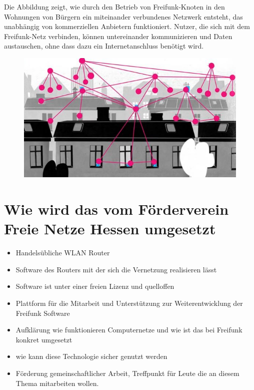 \documentclass[ngerman]{article}
\begin{document}
Die Abbildung zeigt, wie durch den Betrieb von Freifunk-Knoten in den Wohnungen von Bürgern ein miteinander verbundenes Netzwerk entsteht, das unabhängig von kommerziellen Anbietern funktioniert.
Nutzer, die sich mit dem Freifunk-Netz verbinden, können untereinander kommunizieren und Daten austauschen, ohne dass dazu ein Internetanschluss benötigt wird.

\begin{figure}[h!]
	\centering
	\includegraphics[width=.7\textwidth]{freifunk-mesh}
	\label{fig:freifunkwolke}
\end{figure}

\section*{Wie wird das vom Förderverein Freie Netze Hessen umgesetzt}
  \begin{itemize}
    \item Handelsübliche WLAN Router
    \item Software des Routers mit der sich die Vernetzung realisieren lässt
    \item Software ist unter einer freien Lizenz und quelloffen
    \item Plattform für die Mitarbeit und Unterstützung zur Weiterentwicklung der Freifunk Software
    \item Aufklärung wie funktionieren Computernetze und wie ist das bei Freifunk konkret umgesetzt
    \item wie kann diese Technologie sicher genutzt werden
    \item Förderung gemeinschaftlicher Arbeit, Treffpunkt für Leute die an diesem Thema mitarbeiten wollen.
  \end{itemize}
\end{document}

